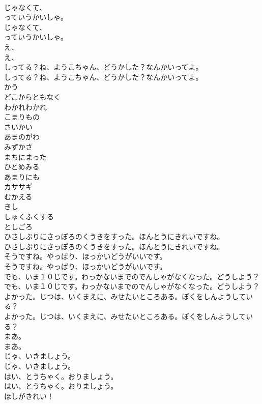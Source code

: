 \documentclass[8pt]{extreport}
\begin{document}
\begin{CJK}{UTF8}{min}
\\	じゃなくて、
\\	っていうかいしゃ。
\\	じゃなくて、
\\	っていうかいしゃ。
\\	え、
\\	え、
\\	しってる？ね、ようこちゃん、どうかした？なんかいってよ。
\\	しってる？ね、ようこちゃん、どうかした？なんかいってよ。
\\	かう
\\	どこからともなく
\\	わかれわかれ
\\	こまりもの
\\	さいかい
\\	あまのがわ
\\	みずかさ
\\	まちにまった
\\	ひとめみる
\\	あまりにも
\\	カササギ
\\	むかえる
\\	きし
\\	しゅくふくする
\\	としごろ
\\	ひさしぶりにさっぽろのくうきをすった。ほんとうにきれいですね。
\\	ひさしぶりにさっぽろのくうきをすった。ほんとうにきれいですね。
\\	そうですね。やっぱり、ほっかいどうがいいです。
\\	そうですね。やっぱり、ほっかいどうがいいです。
\\	でも、いま１０じです。わっかないまでのでんしゃがなくなった。どうしよう？
\\	でも、いま１０じです。わっかないまでのでんしゃがなくなった。どうしよう？
\\	よかった。じつは、いくまえに、みせたいところある。ぼくをしんようしている？
\\	よかった。じつは、いくまえに、みせたいところある。ぼくをしんようしている？
\\	まあ。
\\	まあ。
\\	じゃ、いきましょう。
\\	じゃ、いきましょう。
\\	はい、とうちゃく。おりましょう。
\\	はい、とうちゃく。おりましょう。
\\	ほしがきれい！

\end{CJK}
\end{document}
